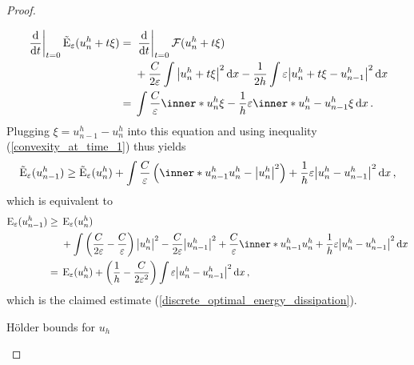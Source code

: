 \begin{proof}
\begin{description}[wide=0pt]
\begin{align*}
			\left. \dv{ t } \right|_{ t= 0 }
			\tilde{\energy}_{ \varepsilon} ( u_{ n }^{ h } + t \xi )
			={}&
			\left. \dv{ t } \right|_{ t = 0 } 
			\mathcal{ F } ( u_{ n }^{ h } + t \xi )
			\\
			{}&+ 
			\frac{ C }{ 2 \varepsilon } 
			\int 
			\abs{ u_{ n }^{ h } + t \xi }^{ 2 } 
			\dd{ x }
			-
			\frac{ 1 }{ 2h } 
			\int 
			\varepsilon
			\abs{ u_{n }^{ h } + t \xi - u_{ n - 1 }^{ h } }^{ 2 } 
			\dd{ x }
			\\
			={}& 
			\int
			\frac{ C }{ \varepsilon }
			\inner*{u_{ n }^{ h }}{\xi}
			-
			\frac{ 1 }{ h }
			\varepsilon
			\inner*{ u_{ n }^{ h } - u_{ n - 1 } ^{ h } }{ \xi }
			\dd{x}.
		\end{align*}
		Plugging $ \xi = u_{ n - 1 }^{ h } - u_{ n }^{ h } $ into this equation and using inequality (\ref{convexity_at_time_1})  thus yields
		\begin{equation*}
			\tilde{\energy}_{ \varepsilon } ( u_{ n - 1 }^{ h } ) 
			\geq
			\tilde{\energy}_{ \varepsilon} ( u_{ n }^{ h } )
			+
			\int
			\frac{ C }{ \varepsilon } 
			\left(
			\inner*{ u_{ n - 1 }^{ h } }{ u_{n }^{ h }}
			-
			\abs{ u_{ n }^{ h }}^{ 2 }
			\right)
			+
			\frac{ 1 }{ h }
			\varepsilon
			\abs{ u_{n }^{ h } - u_{ n -1 }^{ h } }^{ 2 }
			\dd{ x },
		\end{equation*}
		which is equivalent to
		\begin{align*}
			\energy_{ \varepsilon } (u_{ n - 1 }^{ h } )
			\geq {} &
			\energy_{ \varepsilon } (u_{ n }^{ h } )
			\\
			& +
			\int
			\left(
			\frac{ C }{ 2 \varepsilon }
			-
			\frac{ C }{ \varepsilon }
			\right)
			\abs{ u_{ n }^{ h } }^{ 2 }
			-
			\frac{ C }{ 2 \varepsilon }
			\abs{ u_{n - 1 }^{ h } }^{ 2 }
			+ 
			\frac{ C }{ \varepsilon }
			\inner*{ u_{ n - 1 }^{ h } }{ u_{ n }^{ h } }
			+ 
			\frac{ 1 }{ h }
			\varepsilon
			\abs{ u_{ n }^{ h } - u_{ n - 1 }^{ h } }^{ 2 }
			\dd{ x }
			\\
			= {} &
			\energy_{ \varepsilon } ( u_{n }^{ h } )
			+
			\left( 
			\frac{ 1 }{ h }
			- 
			\frac{ C }{ 2 \varepsilon^{ 2 } }
			\right)
			\int 
			\varepsilon \abs{ u_{n }^{ h } - u_{ n - 1 }^{ h } }^{ 2 }
			\dd{ x },
		\end{align*}
		which is the claimed estimate (\ref{discrete_optimal_energy_dissipation}).
		
		\item[Step 4:] Hölder bounds for $ u_{ h } $
		

\end{description}
\end{proof}

